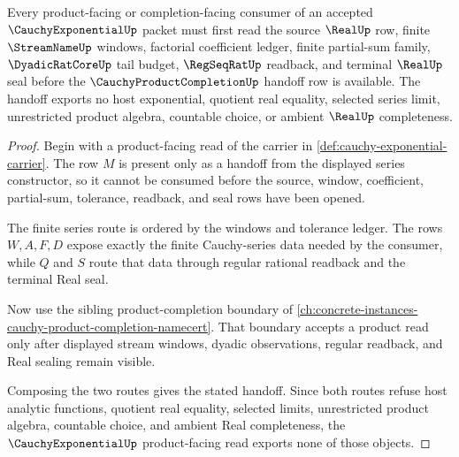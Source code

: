 \begin{theorem}
\label{thm:cauchy-exponential-cauchy-product-handoff}
Every product-facing or completion-facing consumer of an accepted $\CauchyExponentialUp$ packet must first read the source $\RealUp$ row, finite $\StreamNameUp$ windows, factorial coefficient ledger, finite partial-sum family, $\DyadicRatCoreUp$ tail budget, $\RegSeqRatUp$ readback, and terminal $\RealUp$ seal before the $\CauchyProductCompletionUp$ handoff row is available. The handoff exports no host exponential, quotient real equality, selected series limit, unrestricted product algebra, countable choice, or ambient $\RealUp$ completeness.
\end{theorem}
\begin{proof}
Begin with a product-facing read of the carrier in \autoref{def:cauchy-exponential-carrier}. The row $M$ is present only as a handoff from the displayed series constructor, so it cannot be consumed before the source, window, coefficient, partial-sum, tolerance, readback, and seal rows have been opened.

The finite series route is ordered by the windows and tolerance ledger. The rows $W,A,F,D$ expose exactly the finite Cauchy-series data needed by the consumer, while $Q$ and $S$ route that data through regular rational readback and the terminal Real seal.

Now use the sibling product-completion boundary of \autoref{ch:concrete-instances-cauchy-product-completion-namecert}. That boundary accepts a product read only after displayed stream windows, dyadic observations, regular readback, and Real sealing remain visible.

Composing the two routes gives the stated handoff. Since both routes refuse host analytic functions, quotient real equality, selected limits, unrestricted product algebra, countable choice, and ambient Real completeness, the $\CauchyExponentialUp$ product-facing read exports none of those objects.
\end{proof}


